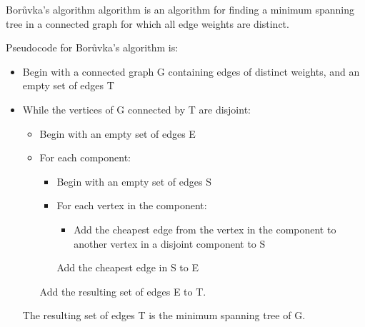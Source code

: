 Bor\r{u}vka's algorithm algorithm is an algorithm
for finding a minimum spanning tree in a connected graph for
which all edge weights are distinct.

Pseudocode for Bor\r{u}vka's algorithm is:

\begin{itemize}
\item
Begin with a connected graph G containing edges of distinct
 weights, and an empty set of edges T
\item
While the vertices of G connected by T are disjoint:
\begin{itemize}
\item
Begin with an empty set of edges E
\item
         For each component:
\begin{itemize}
\item
        Begin with an empty set of edges S
\item
        For each vertex in the component:
 \begin{itemize}
\item
Add the cheapest edge from the vertex in
             the component to another vertex in a disjoint component to S
\end{itemize}
        Add the cheapest edge in S to E
\end{itemize}
    Add the resulting set of edges E to T.
\end{itemize}
The resulting set of edges T is the minimum spanning tree of G.
\end{itemize}

